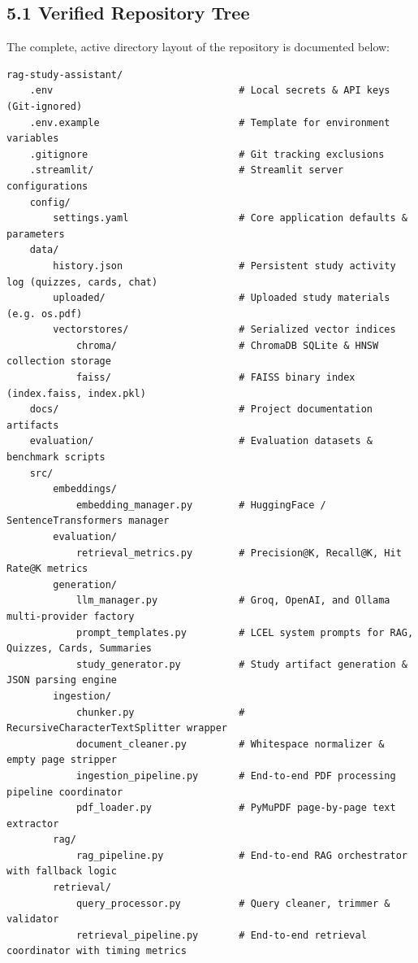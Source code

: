 \documentclass[
]{article}
\begin{document}
\subsection{5.1 Verified Repository
Tree}\label{verified-repository-tree}

The complete, active directory layout of the repository is documented
below:

\begin{verbatim}
rag-study-assistant/
    .env                                # Local secrets & API keys (Git-ignored)
    .env.example                        # Template for environment variables
    .gitignore                          # Git tracking exclusions
    .streamlit/                         # Streamlit server configurations
    config/
        settings.yaml                   # Core application defaults & parameters
    data/
        history.json                    # Persistent study activity log (quizzes, cards, chat)
        uploaded/                       # Uploaded study materials (e.g. os.pdf)
        vectorstores/                   # Serialized vector indices
            chroma/                     # ChromaDB SQLite & HNSW collection storage
            faiss/                      # FAISS binary index (index.faiss, index.pkl)
    docs/                               # Project documentation artifacts
    evaluation/                         # Evaluation datasets & benchmark scripts
    src/
        embeddings/
            embedding_manager.py        # HuggingFace / SentenceTransformers manager
        evaluation/
            retrieval_metrics.py        # Precision@K, Recall@K, Hit Rate@K metrics
        generation/
            llm_manager.py              # Groq, OpenAI, and Ollama multi-provider factory
            prompt_templates.py         # LCEL system prompts for RAG, Quizzes, Cards, Summaries
            study_generator.py          # Study artifact generation & JSON parsing engine
        ingestion/
            chunker.py                  # RecursiveCharacterTextSplitter wrapper
            document_cleaner.py         # Whitespace normalizer & empty page stripper
            ingestion_pipeline.py       # End-to-end PDF processing pipeline coordinator
            pdf_loader.py               # PyMuPDF page-by-page text extractor
        rag/
            rag_pipeline.py             # End-to-end RAG orchestrator with fallback logic
        retrieval/
            query_processor.py          # Query cleaner, trimmer & validator
            retrieval_pipeline.py       # End-to-end retrieval coordinator with timing metrics

\end{verbatim}
\end{document}
